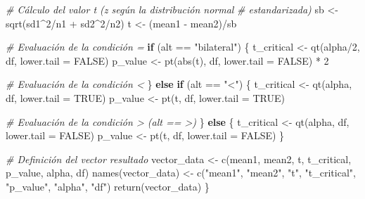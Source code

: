 \documentclass[
]{article}
\newenvironment{Shaded}{\begin{snugshade}}{\end{snugshade}}
\newcommand{\AttributeTok}[1]{\textcolor[rgb]{0.77,0.63,0.00}{#1}}
\newcommand{\CommentTok}[1]{\textcolor[rgb]{0.56,0.35,0.01}{\textit{#1}}}
\newcommand{\ConstantTok}[1]{\textcolor[rgb]{0.00,0.00,0.00}{#1}}
\newcommand{\ControlFlowTok}[1]{\textcolor[rgb]{0.13,0.29,0.53}{\textbf{#1}}}
\newcommand{\DecValTok}[1]{\textcolor[rgb]{0.00,0.00,0.81}{#1}}
\newcommand{\FunctionTok}[1]{\textcolor[rgb]{0.00,0.00,0.00}{#1}}
\newcommand{\NormalTok}[1]{#1}
\newcommand{\OtherTok}[1]{\textcolor[rgb]{0.56,0.35,0.01}{#1}}
\newcommand{\SpecialCharTok}[1]{\textcolor[rgb]{0.00,0.00,0.00}{#1}}
\newcommand{\StringTok}[1]{\textcolor[rgb]{0.31,0.60,0.02}{#1}}
\begin{document}
\begin{Shaded}
\begin{Highlighting}[]
    \CommentTok{\# Cálculo del valor t (z según la distribución normal}
    \CommentTok{\# estandarizada)}
\NormalTok{    sb }\OtherTok{\textless{}{-}} \FunctionTok{sqrt}\NormalTok{(sd1}\SpecialCharTok{\^{}}\DecValTok{2}\SpecialCharTok{/}\NormalTok{n1 }\SpecialCharTok{+}\NormalTok{ sd2}\SpecialCharTok{\^{}}\DecValTok{2}\SpecialCharTok{/}\NormalTok{n2)}
\NormalTok{    t }\OtherTok{\textless{}{-}}\NormalTok{ (mean1 }\SpecialCharTok{{-}}\NormalTok{ mean2)}\SpecialCharTok{/}\NormalTok{sb}

    \CommentTok{\# Evaluación de la condición =}
    \ControlFlowTok{if}\NormalTok{ (alt }\SpecialCharTok{==} \StringTok{"bilateral"}\NormalTok{) \{}
\NormalTok{        t\_critical }\OtherTok{\textless{}{-}} \FunctionTok{qt}\NormalTok{(alpha}\SpecialCharTok{/}\DecValTok{2}\NormalTok{, df, }\AttributeTok{lower.tail =} \ConstantTok{FALSE}\NormalTok{)}
\NormalTok{        p\_value }\OtherTok{\textless{}{-}} \FunctionTok{pt}\NormalTok{(}\FunctionTok{abs}\NormalTok{(t), df, }\AttributeTok{lower.tail =} \ConstantTok{FALSE}\NormalTok{) }\SpecialCharTok{*} \DecValTok{2}

        \CommentTok{\# Evaluación de la condición \textless{}}
\NormalTok{    \} }\ControlFlowTok{else} \ControlFlowTok{if}\NormalTok{ (alt }\SpecialCharTok{==} \StringTok{"\textless{}"}\NormalTok{) \{}
\NormalTok{        t\_critical }\OtherTok{\textless{}{-}} \FunctionTok{qt}\NormalTok{(alpha, df, }\AttributeTok{lower.tail =} \ConstantTok{TRUE}\NormalTok{)}
\NormalTok{        p\_value }\OtherTok{\textless{}{-}} \FunctionTok{pt}\NormalTok{(t, df, }\AttributeTok{lower.tail =} \ConstantTok{TRUE}\NormalTok{)}

        \CommentTok{\# Evaluación de la condición \textgreater{} (alt == \textquotesingle{}\textgreater{}\textquotesingle{})}
\NormalTok{    \} }\ControlFlowTok{else}\NormalTok{ \{}
\NormalTok{        t\_critical }\OtherTok{\textless{}{-}} \FunctionTok{qt}\NormalTok{(alpha, df, }\AttributeTok{lower.tail =} \ConstantTok{FALSE}\NormalTok{)}
\NormalTok{        p\_value }\OtherTok{\textless{}{-}} \FunctionTok{pt}\NormalTok{(t, df, }\AttributeTok{lower.tail =} \ConstantTok{FALSE}\NormalTok{)}
\NormalTok{    \}}

    \CommentTok{\# Definición del vector resultado}
\NormalTok{    vector\_data }\OtherTok{\textless{}{-}} \FunctionTok{c}\NormalTok{(mean1, mean2, t, t\_critical, p\_value, alpha,}
\NormalTok{        df)}
    \FunctionTok{names}\NormalTok{(vector\_data) }\OtherTok{\textless{}{-}} \FunctionTok{c}\NormalTok{(}\StringTok{"mean1"}\NormalTok{, }\StringTok{"mean2"}\NormalTok{, }\StringTok{"t"}\NormalTok{, }\StringTok{"t\_critical"}\NormalTok{,}
        \StringTok{"p\_value"}\NormalTok{, }\StringTok{"alpha"}\NormalTok{, }\StringTok{"df"}\NormalTok{)}
    \FunctionTok{return}\NormalTok{(vector\_data)}
\NormalTok{\}}
\end{Highlighting}
\end{Shaded}
\end{document}
